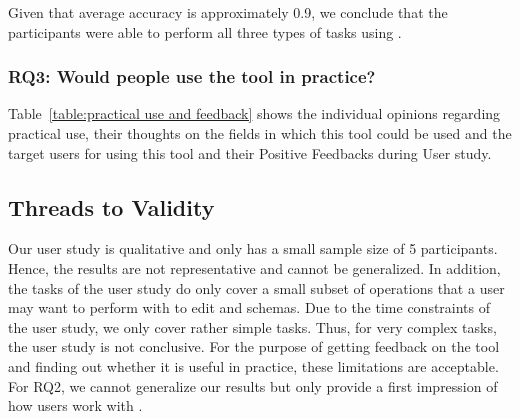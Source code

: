 Given that average accuracy is approximately 0.9, we conclude that the participants were able to perform all three types of tasks using \toolname{}.

\subsubsection{\textbf{RQ3:} Would people use the tool in practice?} %
Table~\ref{table:practical use and feedback} shows the individual opinions regarding practical use, their thoughts on the fields in which this tool could be used and the target users for using this tool and their Positive Feedbacks during User study.







\subsection{Threads to Validity}\label{subsec:threads_to_validity} %

Our user study is qualitative and only has a small sample size of 5 participants.
Hence, the results are not representative and cannot be generalized.
In addition, the tasks of the user study do only cover a small subset of operations
that a user may want to perform with \toolname{} to edit \cfgfiles{} and schemas.
Due to the time constraints of the user study, we only cover rather simple tasks.
Thus, for very complex tasks, the user study is not conclusive.
For the purpose of getting feedback on the tool and finding out whether it is useful in practice, these limitations are acceptable.
For RQ2, we cannot generalize our results but only provide a first impression of how users work with \toolname{}.



